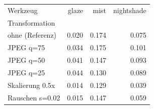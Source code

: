 \begin{tabular}{lrrr}
\toprule
Werkzeug & glaze & mist & nightshade \\
Transformation &  &  &  \\
\midrule
ohne (Referenz) & 0.020 & 0.174 & 0.075 \\
JPEG q=75 & 0.034 & 0.175 & 0.101 \\
JPEG q=50 & 0.041 & 0.147 & 0.093 \\
JPEG q=25 & 0.044 & 0.130 & 0.089 \\
Skalierung 0.5x & 0.014 & 0.129 & 0.039 \\
Rauschen s=0.02 & 0.015 & 0.147 & 0.059 \\
\bottomrule
\end{tabular}
